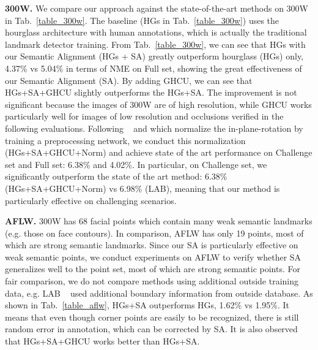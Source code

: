 \documentclass[10pt,twocolumn,letterpaper]{article}
\begin{document}
{{		{\textbf{300W.}  We compare our approach against the state-of-the-art methods on 300W in Tab.~\ref{table_300w}. 
			{The baseline (HGs in Tab.~\ref{table_300w}) uses the hourglass  architecture  with human annotations, which is actually the traditional landmark detector training.} From Tab.~\ref{table_300w},
			we can see that HGs with our Semantic Alignment (HGs + SA) greatly outperform hourglass (HGs) only, 4.37\% vs 5.04\% in terms of NME on Full set, showing the great effectiveness of our Semantic Alignment (SA). By adding GHCU, we can see that HGs+SA+GHCU slightly outperforms the HGs+SA. {The improvement is not significant because the images of 300W are of high resolution, while GHCU works particularly well for images of low resolution and occlusions verified in the following evaluations.}
			Following {~\cite{feng2017wing} and \cite{Yang2017Stacked}} which normalize the in-plane-rotation {by training a preprocessing network}, we conduct this normalization (HGs+SA+GHCU+Norm)  and achieve state of the art performance on Challenge set and Full set: 6.38\% and 4.02\%. In particular, on Challenge set, we significantly outperform the state of the art method: 6.38\% (HGs+SA+GHCU+Norm) vs 6.98\% (LAB), meaning that our method is particularly effective on challenging scenarios. 




			
			\textbf{AFLW.}
			300W has 68 facial points which contain many weak semantic landmarks (e.g. those on face contours). In comparison, AFLW has only 19 points, most of which are strong semantic landmarks. Since our SA is particularly effective on weak semantic points, we conduct experiments on AFLW to verify whether SA generalizes well to the point set, most of which are strong semantic points.  For fair comparison, we do not compare methods using additional outside training data, e.g. LAB ~\cite{wu2018look} used additional boundary information from 
			outside database.
			As shown in Tab.~\ref{table_aflw}, HGs+SA  outperforms HGs, 1.62\% vs 1.95\%. It means that even though corner points are easily to be recognized, there is still random error in annotation, which can be corrected by SA. {It is also observed that HGs+SA+GHCU works better than 
				HGs+SA.} 



}}}
\end{document}
